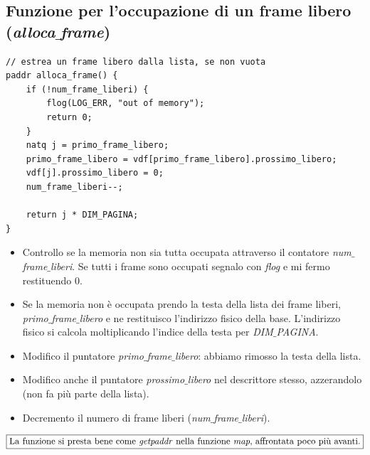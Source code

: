 \documentclass[11pt]{report}
\theoremstyle{definition}
\begin{document}
\subsection{Funzione per l'occupazione di un frame libero (\emph{alloca$\_$frame})}
\small 
\begin{verbatim}
// estrea un frame libero dalla lista, se non vuota
paddr alloca_frame() {
    if (!num_frame_liberi) {
        flog(LOG_ERR, "out of memory");
        return 0;
    }
    natq j = primo_frame_libero;
    primo_frame_libero = vdf[primo_frame_libero].prossimo_libero;
    vdf[j].prossimo_libero = 0;
    num_frame_liberi--;
    
    return j * DIM_PAGINA;
}
\end{verbatim}
\normalsize 
\begin{itemize}
	\item Controllo se la memoria non sia tutta occupata attraverso il contatore \emph{num$\_$frame$\_$liberi}. Se tutti i frame sono occupati segnalo con \emph{flog} e mi fermo restituendo $0$.
	\item Se la memoria non è occupata prendo la testa della lista dei frame liberi, \emph{primo$\_$frame$\_$libero} e ne restituisco l'indirizzo fisico della base. L'indirizzo fisico si calcola moltiplicando l'indice della testa per \emph{DIM$\_$PAGINA}.
	\item Modifico il puntatore \emph{primo$\_$frame$\_$libero}: abbiamo rimosso la testa della lista.  
	\item Modifico anche il puntatore \emph{prossimo$\_$libero} nel descrittore stesso, azzerandolo (non fa più parte della lista).
	\item Decremento il numero di frame liberi (\emph{num$\_$frame$\_$liberi}).
\end{itemize}
\[\boxed{\text{La funzione si presta bene come \emph{getpaddr} nella funzione \emph{map}, affrontata poco più avanti.}}\]
\end{document}
